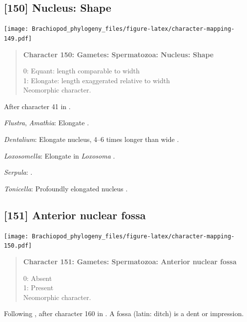 \documentclass[openany]{book}
\begin{document}
\subsection*{{[}150{]} Nucleus: Shape}\label{nucleus-shape}

\texttt{[image: Brachiopod\_phylogeny\_files/figure-latex/character-mapping-149.pdf]}

\begin{quote}
\textbf{Character 150: Gametes: Spermatozoa: Nucleus: Shape}

0: Equant: length comparable to width\\
1: Elongate: length exaggerated relative to width\\
Neomorphic character.
\end{quote}

After character 41 in \citet{Ponder1997}.

\hypertarget{Amathia-coding-150}{}
\emph{Flustra}, \emph{Amathia}: Elongate \citep{Franzen1981}.

\hypertarget{Dentalium-coding-150}{}
\emph{Dentalium}: Elongate nucleus, 4--6 times longer than wide
\citep{DufresneDube1983}.

\hypertarget{Loxosomella-coding-150}{}
\emph{Loxosomella}: Elongate in \emph{Loxosoma} \citep{Franzen2000}.

\hypertarget{Serpula-coding-150}{}
\emph{Serpula}: \citet{Gherardi2011}.

\hypertarget{Tonicella-coding-150}{}
\emph{Tonicella}: Profoundly elongated nucleus
\citep{BucklandNicks1988}.

\subsection*{{[}151{]} Anterior nuclear
fossa}\label{anterior-nuclear-fossa}

\texttt{[image: Brachiopod\_phylogeny\_files/figure-latex/character-mapping-150.pdf]}

\begin{quote}
\textbf{Character 151: Gametes: Spermatozoa: Anterior nuclear fossa}

0: Absent\\
1: Present\\
Neomorphic character.
\end{quote}

Following \citet{Smith2012}, after character 160 in \citet{Giribet2002}.
A fossa (latin: ditch) is a dent or impression.
\end{document}
